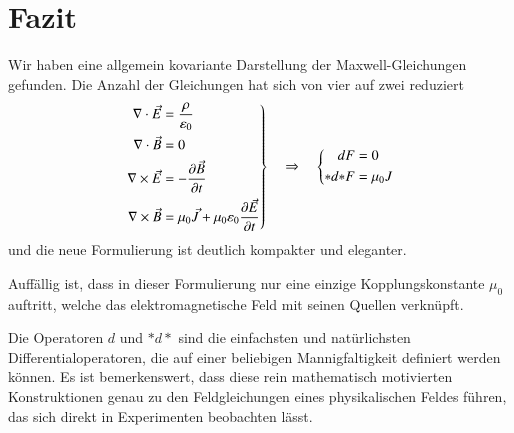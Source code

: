 \section{Fazit}
Wir haben eine allgemein kovariante Darstellung der Maxwell-Gleichungen gefunden. Die Anzahl der Gleichungen hat sich von vier auf zwei reduziert
\[
\left.
\begin{aligned}
	\nabla \cdot \vec{E} &= \frac{\rho}{\varepsilon_0} \\
	\nabla \cdot \vec{B} &= 0 \\
	\nabla \times \vec{E} &= - \frac{\d \vec{B}}{\d t} \\
	\nabla \times \vec{B} &= \mu_0 \vec{J} + \mu_0 \varepsilon_0 \frac{\d \vec{E}}{\d t}
\end{aligned}
\right\}
\quad\Rightarrow\quad
\left\{
\begin{aligned}
	dF &= 0 \\
	{\ast}d{\ast}F &= \mu_0 J 
\end{aligned}
\right.
\]
und die neue Formulierung ist deutlich kompakter und eleganter.

Auffällig ist, dass in dieser Formulierung nur eine einzige Kopplungskonstante $\mu_0$ auftritt, welche das elektromagnetische Feld mit seinen Quellen verknüpft.  

Die Operatoren $d$ und $\ast d \ast$ sind die einfachsten und natürlichsten Differentialoperatoren, die auf einer beliebigen Mannigfaltigkeit definiert werden können. Es ist bemerkenswert, dass diese rein mathematisch motivierten Konstruktionen genau zu den Feldgleichungen eines physikalischen Feldes führen, das sich direkt in Experimenten beobachten lässt.



